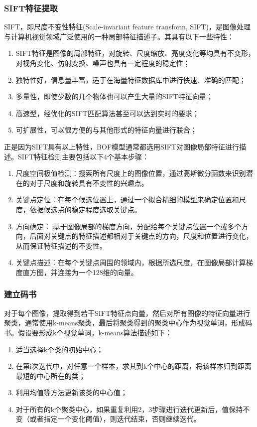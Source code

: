 \subsubsection{SIFT特征提取}
SIFT，即尺度不变性特征(Scale-invariant feature transform, SIFT)，是图像处理与计算机视觉领域广泛使用的一种局部特征描述子\cite{lowe2004distinctive}。其具有以下一些特性：
\begin{enumerate}
\item SIFT特征是图像的局部特征，对旋转、尺度缩放、亮度变化等均具有不变形，对视角变化、仿射变换、噪声也具有一定程度的稳定性；
\item 独特性好，信息量丰富，适于在海量特征数据库中进行快速、准确的匹配；
\item 多量性，即使少数的几个物体也可以产生大量的SIFT特征向量；
\item 高速型，经优化的SIFT匹配算法甚至可以达到实时的要求；
\item 可扩展性，可以很方便的与其他形式的特征向量进行联合；
\end{enumerate}
正是因为SIFT具有以上特性，BOF模型通常都选用SIFT对图像局部特征进行描述。SIFT特征检测主要包括以下4个基本步骤：
\begin{enumerate}
\item 尺度空间极值检测：搜索所有尺度上的图像位置，通过高斯微分函数来识别潜在的对于尺度和旋转具有不变性的兴趣点。
\item 关键点定位：在每个候选位置上，通过一个拟合精细的模型来确定位置和尺度，依据候选点的稳定程度选取关键点。
\item 方向确定： 基于图像局部的梯度方向，分配给每个关键点位置一个或多个方向，后面对关键点的特征描述都相对于关键点的方向，尺度和位置进行变化，从而保证特征描述的不变性。
\item 关键点描述：在每个关键点周围的领域内，根据所选尺度，在图像局部计算梯度直方图，并连接为一个128维的向量。
\end{enumerate}

\subsubsection{建立码书}
对于每个图像，提取得到若干SIFT特征点向量，然后对所有图像的特征向量进行聚类，通常使用k-means聚类，最后将聚类得到的聚类中心作为视觉单词，形成码书。假设要形成k个视觉单词，k-means算法描述如下：
\begin{enumerate}
\item 适当选择k个类的初始中心；
\item 在第i次迭代中，对任意一个样本，求其到k个中心的距离，将该样本归到距离最短的中心所在的类；
\item 利用均值等方法更新该类的中心值；
\item 对于所有的k个聚类中心，如果重复利用2，3步骤进行迭代更新后，值保持不变（或者指定一个变化阈值），则迭代结束，否则继续迭代。
\end{enumerate}

